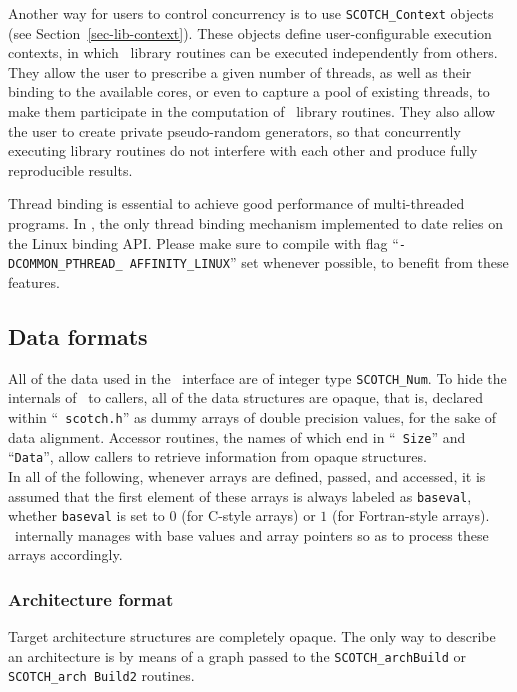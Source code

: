 Another way for users to control concurrency is to use
\texttt{SCOTCH\_\lbt Context} objects (see
Section~\ref{sec-lib-context}). These objects define user-configurable
execution contexts, in which \libscotch\ library routines can be
executed independently from others. They allow the user to prescribe a
given number of threads, as well as their binding to the available
cores, or even to capture a pool of existing threads, to make them
participate in the computation of \libscotch\ library routines. They
also allow the user to create private pseudo-random generators, so
that concurrently executing library routines do not interfere with
each other and produce fully reproducible results.

Thread binding is essential to achieve good performance of
multi-threaded programs. In \scotch, the only thread binding mechanism
implemented to date relies on the Linux binding API. Please make sure
to compile with flag ``\texttt{-DCOMMON\_\lbt PTHREAD\_\lbt
AFFINITY\_\lbt LINUX}'' set whenever possible, to benefit from these
features.

\subsection{Data formats}

All of the data used in the \libscotch\ interface are of integer type
{\tt SCOTCH\_Num}. To hide the internals of \scotch\ to callers, all
of the data structures are opaque, that is, declared within ``{\tt
scotch.h}'' as dummy arrays of double precision values, for the sake of
data alignment. Accessor routines, the names of which end in ``{\tt
Size}'' and ``{\tt Data}'', allow callers to retrieve information from
opaque structures.
\\

In all of the following, whenever arrays are defined, passed, and
accessed, it is assumed that the first element of these arrays is
always labeled as {\tt baseval}, whether {\tt baseval} is set to $0$
(for C-style arrays) or $1$ (for Fortran-style arrays). \scotch\
internally manages with base values and array pointers so as to
process these arrays accordingly.

\subsubsection{Architecture format}

Target architecture structures are completely opaque. The only way
to describe an architecture is by means of a graph passed to the
{\tt SCOTCH\_\lbt arch\lbt Build} or {\tt SCOTCH\_\lbt arch\lbt
Build2} routines.

